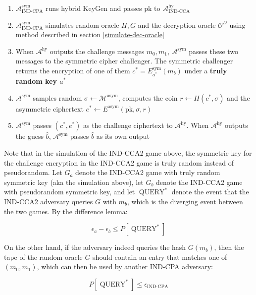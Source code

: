 \documentclass{article}
\begin{document}
\begin{enumerate}
    \item $\mathcal{A}^\text{sym}_\text{IND-CPA}$ runs hybrid KeyGen and passes pk to $\mathcal{A}^\text{hy}_\text{IND-CCA}$
    \item $\mathcal{A}^\text{sym}_\text{IND-CPA}$ simulates random oracle $H, G$ and the decryption oracle $\mathcal{O}^D$ using method described in section \ref{simulate-dec-oracle}
    \item When $\mathcal{A}^\text{hy}$ outputs the challenge messages $m_0, m_1$, $\mathcal{A}^\text{sym}$ passes these two messages to the symmetric cipher challenger. The symmetric challenger returns the encryption of one of them $c^\ast = E^\text{sym}_{a^\ast}(m_b)$ under a \textbf{truly random key $a^\ast$}
    \item $\mathcal{A}^\text{sym}$ samples random $\sigma \leftarrow \mathcal{M}^\text{asym}$, computes the coin $r \leftarrow H(c^\ast, \sigma)$ and the asymmetric ciphertext $e^\ast \leftarrow E^\text{asym}(\text{pk}, \sigma, r)$
    \item $\mathcal{A}^\text{sym}$ passes $(c^\ast, e^\ast)$ as the challenge ciphertext to $\mathcal{A}^\text{hy}$. When $\mathcal{A}^\text{hy}$ outputs the guess $\hat{b}$, $\mathcal{A}^\text{sym}$ passes $\hat{b}$ as its own output
\end{enumerate}

Note that in the simulation of the IND-CCA2 game above, the symmetric key for the challenge encryption in the IND-CCA2 game is truly random instead of pseudorandom. Let $G_a$ denote the IND-CCA2 game with truly random symmetric key (aka the simulation above), let $G_b$ denote the IND-CCA2 game with pseudorandom symmetric key, and let $\operatorname{QUERY}^\ast$ denote the event that the IND-CCA2 adversary queries $G$ with $m_b$, which is the diverging event between the two games. By the difference lemma:

\begin{equation*}
    \epsilon_a - \epsilon_b \leq P[\operatorname{QUERY}^\ast]
\end{equation*}

On the other hand, if the adversary indeed queries the hash $G(m_b)$, then the tape of the random oracle $G$ should contain an entry that matches one of $(m_0, m_1)$, which can then be used by another IND-CPA adversary:

\begin{equation*}
    P[\operatorname{QUERY}^\ast] \leq \epsilon_\text{IND-CPA}
\end{equation*}
\end{document}
